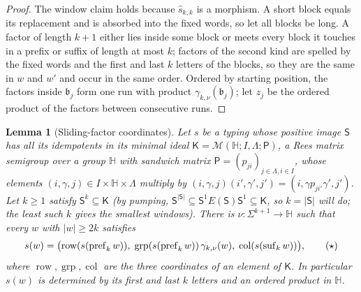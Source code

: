 \documentclass[11pt]{article}
\numberwithin{equation}{section}
\theoremstyle{plain}
\newtheorem{lemma}[theorem]{Lemma}
\theoremstyle{definition}
\theoremstyle{remark}
\theoremstyle{plain}
\begin{document}
\begin{proof}
The window claim holds because $\widehat s_{k,k}$ is a morphism.  A short block equals
its replacement and is absorbed into the fixed words, so let all blocks be long.  A
factor of length $k+1$ either lies inside some block or meets every block it touches
in a prefix or suffix of length at most $k$; factors of the second kind are spelled by
the fixed words and the first and last $k$ letters of the blocks, so they are the same
in $w$ and $w'$ and occur in the same order.  Ordered by starting position, the
factors inside $\mathfrak b_j$ form one run with product $\gamma_{k,\nu}(\mathfrak b_j)$; let
$z_j$ be the ordered product of the factors between consecutive runs.
\end{proof}

\begin{lemma}[Sliding-factor coordinates]
\label{lem:lg-rees-window-coordinate}
Let $s$ be a typing whose positive image $\mathsf S$ has all its idempotents in its minimal
ideal $\mathsf K=\mathcal M({\mathbb H};I,\Lambda;\mathsf P)$, a Rees matrix semigroup over a group
${\mathbb H}$ with sandwich matrix $\mathsf P=(p_{ji})_{j\in\Lambda,i\in I}$, whose elements
$(i,\gamma,j)\in I\times{\mathbb H}\times\Lambda$ multiply by
$(i,\gamma,j)(i',\gamma',j')=(i,\gamma p_{ji'}\gamma',j')$.  Let $k\ge1$ satisfy
$\mathsf S^k\subseteq\mathsf K$ (by pumping,
$\mathsf S^{|\mathsf S|}\subseteq\mathsf S^1E(\mathsf S)\mathsf S^1\subseteq\mathsf K$, so $k=|\mathsf S|$ will do;
the least such $k$ gives the smallest windows).  There is
$\nu:\Sigma^{k+1}\to {\mathbb H}$ such that every $w$ with $|w|\ge2k$ satisfies
\[
 s(w)=\bigl(\operatorname{row}(s(\operatorname{pref}_kw)),\;
 \operatorname{grp}(s(\operatorname{pref}_kw))\,\gamma_{k,\nu}(w),\;
 \operatorname{col}(s(\operatorname{suf}_kw))\bigr),
 \tag{\ensuremath{\star}}
\]
where $\operatorname{row},\operatorname{grp},\operatorname{col}$ are the three coordinates of
an element of $\mathsf K$.  In particular $s(w)$ is determined by its first and last
$k$ letters and an ordered product in ${\mathbb H}$.
\end{lemma}
\end{document}
